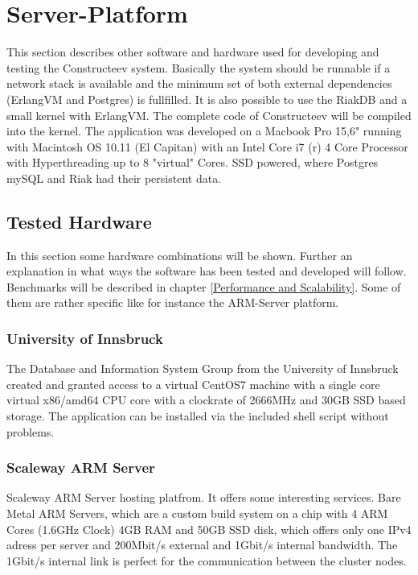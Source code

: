 \section{Server-Platform}
This section describes other software and hardware used for developing and testing the Constructeev system. Basically the system should be runnable if a network stack is available and the minimum set of both external dependencies (ErlangVM and Postgres) is fullfilled. 
It is also possible to use the RiakDB and a small kernel with ErlangVM. The complete code of Constructeev will be compiled into the kernel.
\newline
The application was developed on a Macbook Pro 15,6" running with Macintosh OS 10.11 (El Capitan) with an Intel Core i7 (r) 4 Core Processor with Hyperthreading up to 8 "virtual" Cores. SSD powered, where Postgres mySQL and Riak had their persistent data. 

\subsection{Tested Hardware}
In this section some hardware combinations will be shown. Further an explanation in what ways the software has been tested and developed will follow. Benchmarks will be described in chapter \ref{Performance and Scalability}. Some of them are rather specific like for instance the ARM-Server platform. 

\subsubsection{University of Innsbruck}
The Database and Information System Group from the University of Innsbruck created and granted access to a virtual CentOS7 machine with a single core virtual x86/amd64 CPU core with a clockrate of 2666MHz and 30GB SSD based storage. The application can be installed via the included shell script without problems.

\subsubsection{Scaleway ARM Server}
Scaleway ARM Server hosting platfrom. It offers some interesting services. Bare Metal ARM Servers, which are a custom build system on a chip with 4 ARM Cores (1.6GHz Clock) 4GB RAM and 50GB SSD disk, which offers only one IPv4 adress per server and 200Mbit/s external and 1Gbit/s internal bandwidth. The 1Gbit/s internal link is perfect for the communication between the cluster nodes. 


